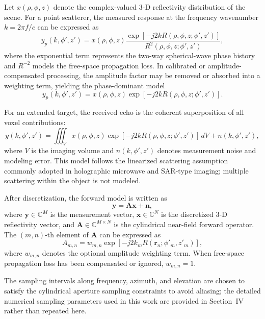 \documentclass[journal]{IEEEtran}
\begin{document}
Let \(x(\rho,\phi,z)\) denote the complex-valued 3-D reflectivity distribution of the scene. For a point scatterer, the measured response at the frequency wavenumber \(k=2\pi f/c\) can be expressed as
\begin{equation}
 y_p(k,\phi',z')=
 x(\rho,\phi,z)\frac{\exp[-j2kR(\rho,\phi,z;\phi',z')]}{R^2(\rho,\phi,z;\phi',z')},
\label{eq:point_model_full}
\end{equation}
where the exponential term represents the two-way spherical-wave phase history and \(R^{-2}\) models the free-space propagation loss. In calibrated or amplitude-compensated processing, the amplitude factor may be removed or absorbed into a weighting term, yielding the phase-dominant model
\begin{equation}
 y_p(k,\phi',z')=
 x(\rho,\phi,z)\exp[-j2kR(\rho,\phi,z;\phi',z')].
\label{eq:point_model_phase}
\end{equation}

For an extended target, the received echo is the coherent superposition of all voxel contributions:
\begin{equation}
 y(k,\phi',z')=
 \iiint_{V} x(\rho,\phi,z)
 \exp[-j2kR(\rho,\phi,z;\phi',z')]\, dV
 + n(k,\phi',z'),
\label{eq:continuous_forward}
\end{equation}
where \(V\) is the imaging volume and \(n(k,\phi',z')\) denotes measurement noise and modeling error. This model follows the linearized scattering assumption commonly adopted in holographic microwave and SAR-type imaging; multiple scattering within the object is not modeled.

After discretization, the forward model is written as
\begin{equation}
\mathbf{y}=\mathbf{A}\mathbf{x}+\mathbf{n},
\label{eq:discrete_forward}
\end{equation}
where \(\mathbf{y}\in\mathbb{C}^{M}\) is the measurement vector, \(\mathbf{x}\in\mathbb{C}^{N}\) is the discretized 3-D reflectivity vector, and \(\mathbf{A}\in\mathbb{C}^{M\times N}\) is the cylindrical near-field forward operator. The \((m,n)\)-th element of \(\mathbf{A}\) can be expressed as
\begin{equation}
 A_{m,n}=w_{m,n}\exp[-j2k_m R(\mathbf{r}_n;\phi'_m,z'_m)],
\label{eq:system_matrix}
\end{equation}
where \(w_{m,n}\) denotes the optional amplitude weighting term. When free-space propagation loss has been compensated or ignored, \(w_{m,n}=1\).

The sampling intervals along frequency, azimuth, and elevation are chosen to satisfy the cylindrical aperture sampling constraints to avoid aliasing; the detailed numerical sampling parameters used in this work are provided in Section~IV rather than repeated here.
\end{document}
